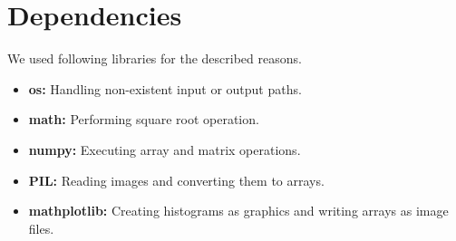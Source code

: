 \documentclass[conference]{IEEEtran}
\begin{document}
\section{Dependencies}
We used following libraries for the described reasons.
\begin{itemize}
	\item \textbf{os:} Handling non-existent input or output paths.
	\item \textbf{math:} Performing square root operation.
	\item \textbf{numpy:} Executing array and matrix operations.
	\item \textbf{PIL:} Reading images and converting them to arrays.
	\item \textbf{mathplotlib:} Creating histograms as graphics and writing arrays as image files.
\end{itemize}
\end{document}
